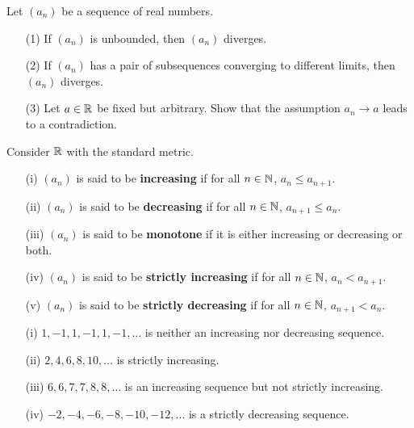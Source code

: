 \documentclass[a4paper]{article}
\begin{document}
\begin{remark}
    Let \( ({a}_{n}) \) be a sequence of real numbers.
    \begin{enumerate}
        \item[(1)] If \( ({a}_{n}) \) is unbounded, then \( ({a}_{n}) \) diverges.
        \item[(2)] If \( ({a}_{n}) \) has a pair of subsequences converging to different limits, then \( ({a}_{n}) \) diverges.
        \item[(3)] Let \( a \in \mathbb{R}  \) be fixed but arbitrary. Show that the assumption \( {a}_{n} \to a  \) leads to a contradiction.
    \end{enumerate}
\end{remark}

\begin{definition}
    Consider \( \mathbb{R}  \) with the standard metric.
    \begin{enumerate}
        \item[(i)] \( ({a}_{n}) \) is said to be \textbf{increasing} if for all \( n \in \mathbb{N}  \), \( {a}_{n} \leq {a}_{n+1}  \).
        \item[(ii)] \( ({a}_{n}) \) is said to be \textbf{decreasing} if for all \( n \in \mathbb{N}  \), \( {a}_{n+1} \leq {a}_{n} \).
        \item[(iii)] \( ({a}_{n}) \) is said to be \textbf{monotone} if it is either increasing or decreasing or both.
        \item[(iv)] \( ({a}_{n}) \) is said to be \textbf{strictly increasing} if for all \( n \in \mathbb{N}  \), \( {a}_{n} < {a}_{n+1}.  \)
        \item[(v)] \( ({a}_{n})  \) is said to be \textbf{strictly decreasing} if for all \( n \in \mathbb{N}  \), \( {a}_{n+1} < {a}_{n} \).
    \end{enumerate}
\end{definition}

\begin{eg}
    \begin{enumerate}
        \item[(i)] \( 1,-1,1,-1,1,-1, \dots \) is neither an increasing nor decreasing sequence.
        \item[(ii)] \( 2,4,6,8,10, \dots \) is strictly increasing.
        \item[(iii)] \( 6,6,7,7,8,8, \dots \) is an increasing sequence but not strictly increasing.
        \item[(iv)] \( -2,-4,-6,-8,-10, -12, \dots \) is a strictly decreasing sequence.
    \end{enumerate}
\end{eg}
\end{document}
